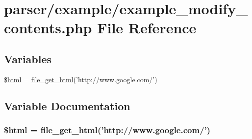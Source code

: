 \hypertarget{example__modify__contents_8php}{\section{parser/example/example\+\_\+modify\+\_\+contents.php File Reference}
\label{example__modify__contents_8php}
}
\subsection*{Variables}
\begin{DoxyCompactItemize}
\item 
\hyperlink{example__modify__contents_8php_a6f96e7fc92441776c9d1cd3386663b40}{\$html} = \hyperlink{simple__html__dom_8php_af2164941db8b68168c1105687e179d27}{file\+\_\+get\+\_\+html}('http\+://www.\+google.\+com/')
\end{DoxyCompactItemize}


\subsection{Variable Documentation}
\hypertarget{example__modify__contents_8php_a6f96e7fc92441776c9d1cd3386663b40}{
\subsubsection[{\$html}]{\setlength{\rightskip}{0pt plus 5cm}\$html = {\bf file\+\_\+get\+\_\+html}('http\+://www.\+google.\+com/')}}\label{example__modify__contents_8php_a6f96e7fc92441776c9d1cd3386663b40}
